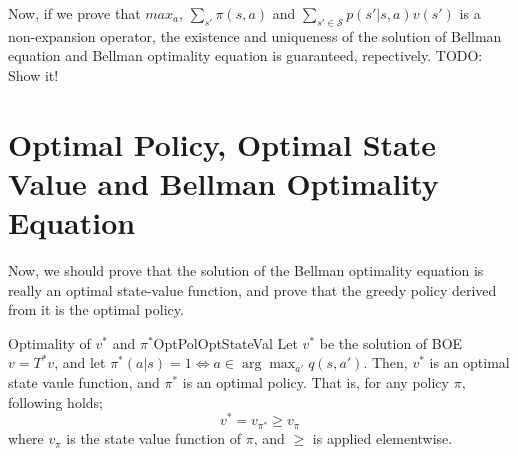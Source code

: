         Now, if we prove that $max_a$, $\sum_{s'} \pi(s,a)$ and $\sum_{s' \in \mathcal{S}} p(s'|s,a) v(s')$ is a non-expansion operator,
        the existence and uniqueness of the solution of Bellman equation and Bellman optimality equation is guaranteed, repectively.
        TODO: Show it!

\section{Optimal Policy, Optimal State Value and Bellman Optimality Equation}\label{sec:OptPolOptStateValBOE}
    Now, we should prove that the solution of the Bellman optimality equation is really an optimal state-value function,
    and prove that the greedy policy derived from it is the optimal policy.
    \begin{thm}{Optimality of $v^*$ and $\pi^*$}{OptPolOptStateVal}
            Let $v^*$ be the solution of BOE $v=T^* v$, and let $\pi^*(a|s) = 1 \Leftrightarrow a \in \arg\max_{a'}q(s,a')$.
            Then, $v^*$ is an optimal state vaule function, and $\pi^*$ is an optimal policy. That is, for any policy $\pi$,
            following holds;
            \begin{equation}
                v^* = v_{\pi^*} \geq v_\pi
            \end{equation}
            where $v_\pi$ is the state value function of $\pi$, and $\geq$ is applied elementwise.
        \end{thm}
